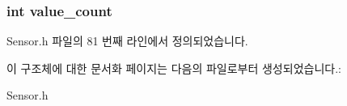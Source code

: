 \hypertarget{struct__UltraViolet__data_a40a079bfc72408819dc78da308203a74}{
\subsubsection[{value\-\_\-count}]{\setlength{\rightskip}{0pt plus 5cm}int value\-\_\-count}}\label{struct__UltraViolet__data_a40a079bfc72408819dc78da308203a74}


Sensor.\-h 파일의 81 번째 라인에서 정의되었습니다.



이 구조체에 대한 문서화 페이지는 다음의 파일로부터 생성되었습니다.\-:\begin{DoxyCompactItemize}
\item 
Sensor.\-h\end{DoxyCompactItemize}
